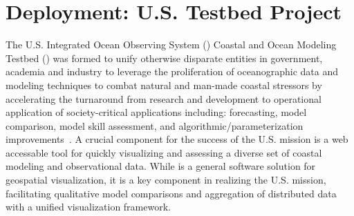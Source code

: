 \section{\sciwms{} Deployment: U.S. \ioos{} \comt{} Testbed Project}
\label{sec:ioos}


The U.S. Integrated Ocean Observing System (\ioos{}) Coastal and Ocean
Modeling Testbed (\comt{}) was formed to unify otherwise disparate
entities in government, academia and industry to leverage the
proliferation of oceanographic data and modeling techniques to combat
natural and man-made coastal stressors by accelerating the turnaround
from research and development to operational application of
society-critical applications including: forecasting, model
comparison, model skill assessment, and algorithmic/parameterization
improvements~\cite{luettich13}. A crucial component for the success of
the U.S. \ioos{} \comt{} mission is a web accessable tool for quickly
visualizing and assessing a diverse set of coastal modeling and
observational data. While \sciwms{} is a general software solution for
geospatial visualization, it is a key component in realizing the
U.S. \ioos{} \comt{} mission, facilitating qualitative model
comparisons and aggregation of distributed data with a unified
visualization framework.

